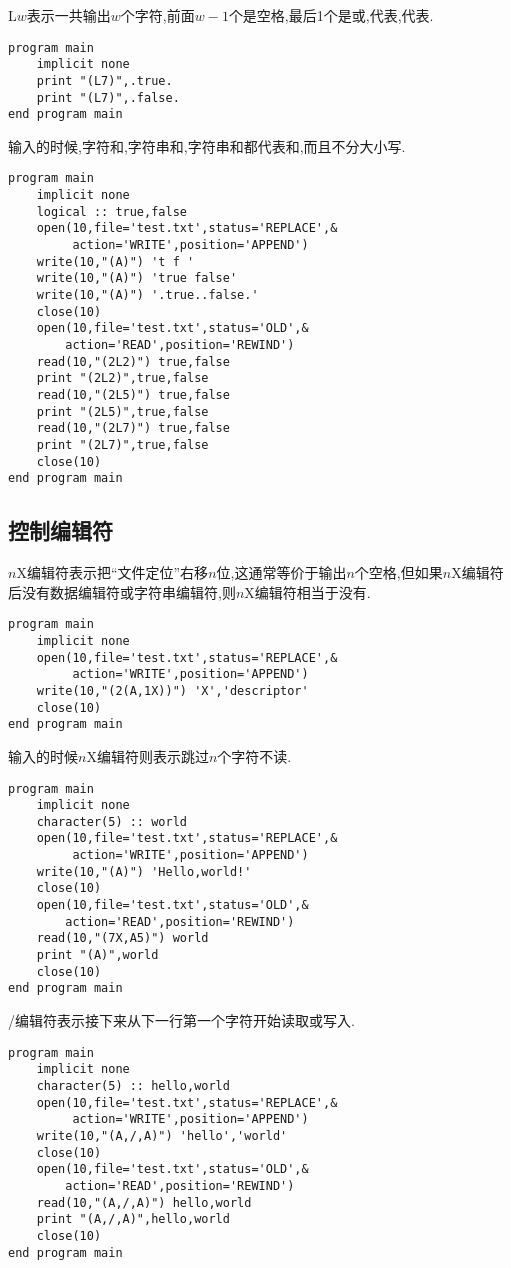 L$w$表示一共输出$w$个字符,前面$w-1$个是空格,最后1个是或,代表,代表.
\begin{lstlisting}
program main
    implicit none
    print "(L7)",.true.
    print "(L7)",.false.
end program main
\end{lstlisting}
输入的时候,字符和,字符串和,字符串和都代表和,而且不分大小写.
\begin{lstlisting}
program main
    implicit none
    logical :: true,false
    open(10,file='test.txt',status='REPLACE',&
         action='WRITE',position='APPEND')
    write(10,"(A)") 't f '
    write(10,"(A)") 'true false'
    write(10,"(A)") '.true..false.'
    close(10)
    open(10,file='test.txt',status='OLD',&
        action='READ',position='REWIND')
    read(10,"(2L2)") true,false
    print "(2L2)",true,false
    read(10,"(2L5)") true,false
    print "(2L5)",true,false
    read(10,"(2L7)") true,false
    print "(2L7)",true,false
    close(10)
end program main
\end{lstlisting}

\subsection{控制编辑符}

$n$X编辑符表示把``文件定位''右移$n$位,这通常等价于输出$n$个空格,但如果$n$X编辑符后没有数据编辑符或字符串编辑符,则$n$X编辑符相当于没有.
\begin{lstlisting}
program main
    implicit none
    open(10,file='test.txt',status='REPLACE',&
         action='WRITE',position='APPEND')
    write(10,"(2(A,1X))") 'X','descriptor'
    close(10)
end program main
\end{lstlisting}
输入的时候$n$X编辑符则表示跳过$n$个字符不读.
\begin{lstlisting}
program main
    implicit none
    character(5) :: world
    open(10,file='test.txt',status='REPLACE',&
         action='WRITE',position='APPEND')
    write(10,"(A)") 'Hello,world!'
    close(10)
    open(10,file='test.txt',status='OLD',&
        action='READ',position='REWIND')
    read(10,"(7X,A5)") world
    print "(A)",world
    close(10)
end program main
\end{lstlisting}

/编辑符表示接下来从下一行第一个字符开始读取或写入.
\begin{lstlisting}
program main
    implicit none
    character(5) :: hello,world
    open(10,file='test.txt',status='REPLACE',&
         action='WRITE',position='APPEND')
    write(10,"(A,/,A)") 'hello','world'
    close(10)
    open(10,file='test.txt',status='OLD',&
        action='READ',position='REWIND')
    read(10,"(A,/,A)") hello,world
    print "(A,/,A)",hello,world
    close(10)
end program main
\end{lstlisting}

